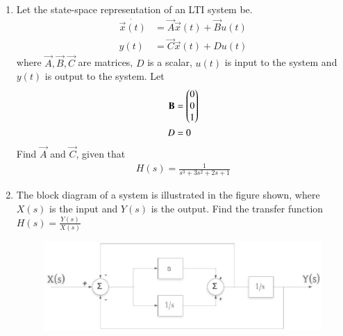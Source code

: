 \documentclass[journal,12pt,twocolumn]{IEEEtran}
\renewcommand\thesection{\arabic{section}}
\begin{document}
\begin{enumerate}[label=\arabic*.,ref=\thesection.\theenumi]
\item Let the state-space representation of an LTI system be.
\begin{align}
\label{eq:state_space1}
\dot{\vec{x}(t)}&=\vec{A}\vec{x}(t)+\vec{B}u(t)
\\
y(t)&=\vec{C}\vec{x}(t)+Du(t)
\label{eq:state_space2}
\end{align}
%
where $\vec{A},\vec{B},\vec{C}$ are matrices, $D$ is a scalar, $u(t)$ is input to the system and $y(t)$ is output to the system. Let 
\begin{align}
\mathbf{B} &= \begin{pmatrix}
 0\\0\\1
\end{pmatrix}
\\
D&=0
\end{align}
Find $\vec{A}$ and $\vec{C}$, given that
\begin{align}
H(s)=\frac{1}{s^3+3s^2+2s+1}
\end{align}
%
\item The block diagram of a system is illustrated in the figure shown, where $X(s)$ is the input and $Y(s)$ is the output. Find the transfer function $H(s)=\frac{Y(s)}{X(s)}$
\begin{figure}
\includegraphics[width=\columnwidth]{./figs/pic1.eps}

\end{figure}
\end{enumerate}
\end{document}
